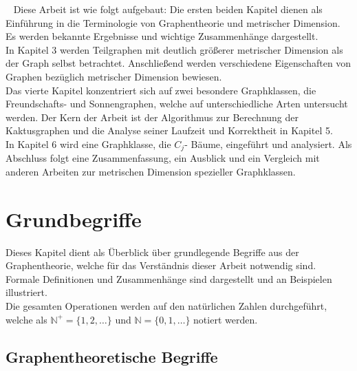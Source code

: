 \vspace{-2mm}
~\linebreak
Diese Arbeit ist wie folgt aufgebaut: Die ersten beiden Kapitel dienen als Einführung in die Terminologie von Graphentheorie und metrischer Dimension. Es werden bekannte Ergebnisse und wichtige Zusammenhänge dargestellt.\\In Kapitel 3 werden Teilgraphen mit deutlich größerer metrischer Dimension als der Graph selbst betrachtet. Anschließend werden verschiedene Eigenschaften von Graphen bezüglich metrischer Dimension bewiesen.\\ 
Das vierte Kapitel konzentriert sich auf zwei besondere Graphklassen, die Freundschafts- und Sonnengraphen, welche auf unterschiedliche Arten untersucht werden. Der Kern der Arbeit ist der Algorithmus zur Berechnung der Kaktusgraphen und die Analyse seiner Laufzeit und Korrektheit in Kapitel 5.\\In Kapitel 6 wird eine Graphklasse, die $C_j$- Bäume, eingeführt und analysiert. Als Abschluss folgt eine Zusammenfassung, ein Ausblick und ein Vergleich mit anderen Arbeiten zur metrischen Dimension spezieller Graphklassen.
\chapter{Grundbegriffe}
\vspace{-4mm}
Dieses Kapitel dient als Überblick über grundlegende Begriffe aus der Graphentheorie, welche für das Verständnis dieser Arbeit notwendig sind. Formale Definitionen und Zusammenhänge sind dargestellt und an Beispielen illustriert.%
\\
Die gesamten Operationen werden auf den natürlichen Zahlen durchgeführt, welche als $\mathbb{N}^+=\{1,2,\ldots\}$ und $\mathbb{N}=\{0,1,\ldots\}$ notiert werden.
\vspace{-2mm}
\section{Graphentheoretische Begriffe}
\vspace{-1mm}
\label{chap_prel}
